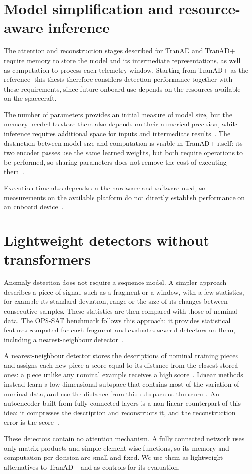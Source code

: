 \section{Model simplification and resource-aware inference}
\label{sec:background-efficiency}

The attention and reconstruction stages described for TranAD and
TranAD+ require memory to store the model and its intermediate
representations, as well as computation to process each telemetry
window. Starting from TranAD+ as the reference, this thesis therefore
considers detection performance together with these requirements,
since future onboard use depends on the resources available
on the spacecraft.

The number of parameters provides an initial measure of model size,
but the memory needed to store them also depends on their numerical
precision, while inference requires additional space for inputs and
intermediate results~\cite{Sze2017EfficientDNN}.
The distinction between model size and computation is visible in
TranAD+ itself: its two encoder passes use the same learned weights,
but both require operations to be performed, so sharing parameters
does not remove the cost of executing them~\cite{TranADPlusReferenceCode}.

Execution time also depends on the hardware and software used,
so measurements on the available platform do not directly establish
performance on an onboard device~\cite{Sze2017EfficientDNN}.

\section{Lightweight detectors without transformers}
\label{sec:background-lightweight}

Anomaly detection does not require a sequence model. A simpler approach
describes a piece of signal, such as a fragment or a window, with a few
statistics, for example its standard deviation, range or the size of its
changes between consecutive samples. These statistics are then compared
with those of nominal data. The \ac{OPS-SAT} benchmark follows this approach:
it provides statistical features computed for each fragment and
evaluates several detectors on them, including a nearest-neighbour
detector~\cite{Ruszczak2025OPSSAT}.

A nearest-neighbour detector stores the descriptions of nominal training
pieces and assigns each new piece a score equal to its distance from the
closest stored ones: a piece unlike any nominal example receives a high
score~\cite{Chandola2009AnomalySurvey}. Linear methods instead learn a
low-dimensional subspace that contains most of the variation of nominal
data, and use the distance from this subspace as the
score~\cite{Chandola2009AnomalySurvey}. An autoencoder built from fully
connected layers is a non-linear counterpart of this idea: it compresses
the description and reconstructs it, and the reconstruction error is the
score~\cite{Goodfellow2016DeepLearning}.

These detectors contain no attention mechanism. A fully connected network
uses only matrix products and simple element-wise functions, so its
memory and computation per decision are small and fixed. We use them as
lightweight alternatives to TranAD+ and as controls for its evaluation.
